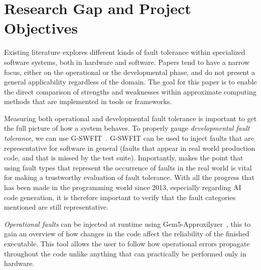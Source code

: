 \section{Research Gap and Project Objectives}

Existing literature explores different kinds of fault tolerance within specialized software systems, both in hardware and software. Papers tend to have a narrow focus, either on the operational or the developmental phase, and do not present a general applicability regardless of the domain.
The goal for this paper is to enable the direct comparison of strengths and weaknesses within approximate computing methods that are implemented in tools or frameworks. 



Measuring both operational and developmental fault tolerance is important to get the full picture of how a system behaves.
To properly gauge {\em developmental fault tolerance}, we can use G-SWFIT~\citep{duraes2006emulation}. G-SWFIT can be used to inject faults that are representative for software in general (faults that appear in real world production code, and that is missed by the test suite). Importantly, \citet{natella2012fault} makes the point that using fault types that represent the occurrence of faults in the real world is vital for making a trustworthy evaluation of fault tolerance. With all the progress that has been made in the programming world since 2013, especially regarding AI code generation, it is therefore important to verify that the fault categories mentioned are still representative.

{\em Operational faults} can be injected at runtime using Gem5-Approxilyzer~\citep{venkatagiri2019gem5}, this to gain an overview of how changes in the code affect the reliability of the finished executable. This tool allows the user to follow how operational errors propagate throughout the code unlike anything that can practically be performed only in hardware.

